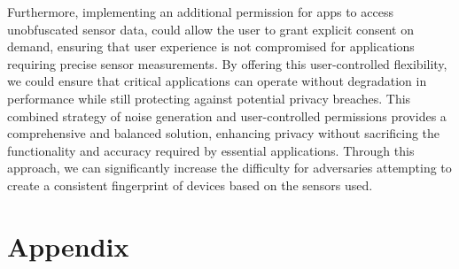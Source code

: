 \documentclass[11pt,
  oneside,openany,    %
]{scrreprt}
\begin{document}
Furthermore, implementing an additional permission for apps to access unobfuscated sensor data, could allow the user to grant explicit consent on demand, ensuring that user experience is not compromised for applications requiring precise sensor measurements.
By offering this user-controlled flexibility, we could ensure that critical applications can operate without degradation in performance while still protecting against potential privacy breaches.
This combined strategy of noise generation and user-controlled permissions provides a comprehensive and balanced solution, enhancing privacy without sacrificing the functionality and accuracy required by essential applications. 
Through this approach, we can significantly increase the difficulty for adversaries attempting to create a consistent fingerprint of devices based on the sensors used. 



\printbibliography[heading=bibintoc]

\appendix

\chapter{Appendix}
\label{chap:appendix}

\end{document}

